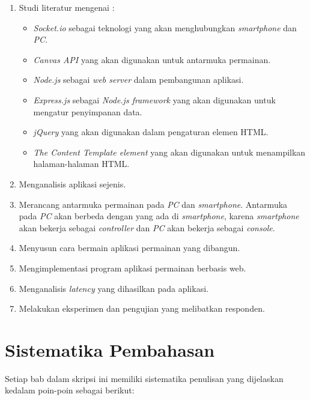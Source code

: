 \begin{enumerate}
	\item Studi literatur mengenai :
		\begin{itemize}
			\item \textit{Socket.io} sebagai teknologi yang akan menghubungkan \textit{smartphone} dan \textit{PC}.
			\item \textit{Canvas API} yang akan digunakan untuk antarmuka permainan.
			\item \textit{Node.js} sebagai \textit{web server} dalam pembangunan aplikasi. 	
			\item \textit{Express.js} sebagai \textit{Node.js framework} yang akan digunakan untuk mengatur penyimpanan data.
			\item \textit{jQuery} yang akan digunakan dalam pengaturan elemen HTML.
			\item \textit{The Content Template element} yang akan digunakan untuk menampilkan halaman-halaman HTML.
		\end{itemize}
	\item Menganalisis aplikasi sejenis.
	\item Merancang antarmuka permainan pada \textit{PC} dan \textit{smartphone}. Antarmuka pada \textit{PC} akan berbeda dengan yang ada di \textit{smartphone}, karena \textit{smartphone} akan bekerja sebagai \textit{controller} dan \textit{PC} akan bekerja sebagai \textit{console}.
	\item Menyusun cara bermain aplikasi permainan yang dibangun.
	\item Mengimplementasi program aplikasi permainan berbasis web.
	\item Menganalisis \textit{latency} yang dihasilkan pada aplikasi.
	\item Melakukan eksperimen dan pengujian yang melibatkan responden.
\end{enumerate}

\section{Sistematika Pembahasan}
\label{sec:sispem}
Setiap bab dalam skripsi ini memiliki sistematika penulisan yang dijelaskan kedalam poin-poin sebagai berikut:

